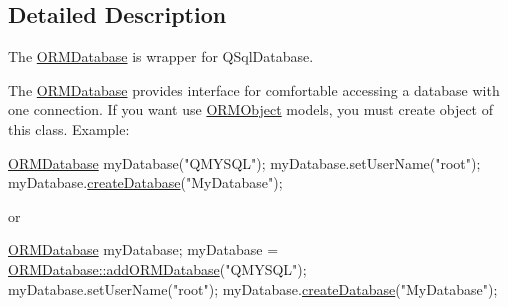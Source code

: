\subsection{Detailed Description}
The \hyperlink{class_o_r_m_database}{O\-R\-M\-Database} is wrapper for Q\-Sql\-Database. 

The \hyperlink{class_o_r_m_database}{O\-R\-M\-Database} provides interface for comfortable accessing a database with one connection. If you want use \hyperlink{class_o_r_m_object}{O\-R\-M\-Object} models, you must create object of this class. Example\-: 
\begin{DoxyCode}
\hyperlink{class_o_r_m_database}{ORMDatabase} myDatabase(\textcolor{stringliteral}{"QMYSQL"});
myDatabase.setUserName(\textcolor{stringliteral}{"root"});
myDatabase.\hyperlink{class_o_r_m_database_a9c500c24e76bac9fd8d0e86865318293}{createDatabase}(\textcolor{stringliteral}{"MyDatabase"});
\end{DoxyCode}
 or 
\begin{DoxyCode}
\hyperlink{class_o_r_m_database}{ORMDatabase} myDatabase;
myDatabase = \hyperlink{class_o_r_m_database_ac560b3727f23580cc5c28e70c7460cb4}{ORMDatabase::addORMDatabase}(\textcolor{stringliteral}{"QMYSQL"});
myDatabase.setUserName(\textcolor{stringliteral}{"root"});
myDatabase.\hyperlink{class_o_r_m_database_a9c500c24e76bac9fd8d0e86865318293}{createDatabase}(\textcolor{stringliteral}{"MyDatabase"});
\end{DoxyCode}
 

